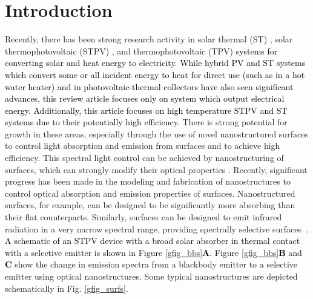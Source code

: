 \documentclass[review]{elsarticle}
\begin{document}
\linenumbers

\providecommand{\noopsort}[1]{}\providecommand{\singleletter}[1]{#1}%
               

\section{Introduction}
Recently, there has been strong research activity in solar thermal (ST) \cite{g1,g2}, solar thermophotovoltaic (STPV) \cite{g3,g4,g5,nnn1}, and thermophotovoltaic (TPV) \cite{g6,g7} \textcolor{black}{systems for converting solar and heat energy to electricity.  While hybrid PV and ST systems which convert some or all incident energy to heat for direct use (such as in a hot water heater) and in photovoltaic-thermal collectors have also seen significant advances, this review article focuses only on system which output electrical energy.  Additionally, this article focuses on high temperature STPV and ST systems due to their potentially high efficiency.}   There is strong potential for growth in these areas, especially through the use of novel nanostructured surfaces to control light absorption and emission from surfaces and to achieve high efficiency. This spectral light control can be achieved by nanostructuring of surfaces, which can strongly modify their optical properties \cite{g8,g9,RF_OptExp_2009}. Recently, significant progress has been made in the modeling and fabrication of nanostructures to control optical absorption and emission properties of surfaces. Nanostructured surfaces, for example, can be designed to be significantly more absorbing than their flat counterparts.  Similarly, surfaces can be designed to emit infrared radiation in a very narrow spectral range, providing spectrally selective surfaces~\cite{G_PS_1985, C_RPP_2014}. \textcolor{black}{ A schematic of 
an STPV device with a broad solar absorber in thermal contact with a selective emitter
is shown in Figure \ref{gfig_bbs}{\bf A}.  Figure \ref{gfig_bbs}{\bf B} and {\bf C}} show the change in emission spectra from a blackbody emitter to a selective emitter using optical nanostructures.  Some typical nanostructures are depicted schematically in Fig. \ref{gfig_surfs}.  
\end{document}

